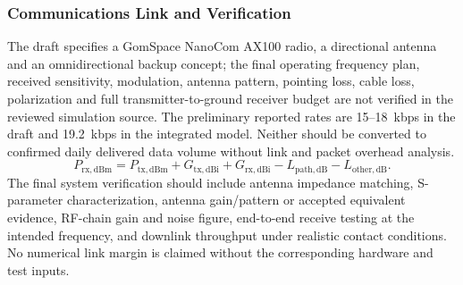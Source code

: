 \subsubsection{Communications Link and Verification}\label{app:rf-link}
The draft specifies a GomSpace NanoCom AX100 radio, a directional antenna and an omnidirectional backup concept; the final operating frequency plan, received sensitivity, modulation, antenna pattern, pointing loss, cable loss, polarization and full transmitter-to-ground receiver budget are not verified in the reviewed simulation source. The preliminary reported rates are 15--18~kbps in the draft and 19.2~kbps in the integrated model. Neither should be converted to confirmed daily delivered data volume without link and packet overhead analysis.
\begin{equation}\label{eq:rf-link-budget}P_{\mathrm{rx,dBm}}=P_{\mathrm{tx,dBm}}+G_{\mathrm{tx,dBi}}+G_{\mathrm{rx,dBi}}-L_{\mathrm{path,dB}}-L_{\mathrm{other,dB}}.\end{equation}
The final system verification should include antenna impedance matching, S-parameter characterization, antenna gain/pattern or accepted equivalent evidence, RF-chain gain and noise figure, end-to-end receive testing at the intended frequency, and downlink throughput under realistic contact conditions. No numerical link margin is claimed without the corresponding hardware and test inputs.
